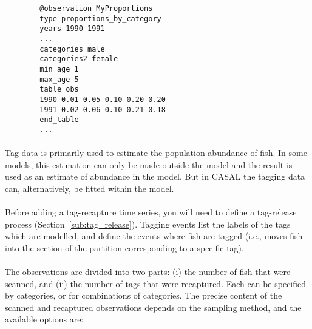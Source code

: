{{{{{\small{\begin{verbatim}
		@observation MyProportions
		type proportions_by_category
		years 1990 1991
		...
		categories male
		categories2 female
		min_age 1
		max_age 5
		table obs
		1990 0.01 0.05 0.10 0.20 0.20
		1991 0.02 0.06 0.10 0.21 0.18
		end_table
		...
		\end{verbatim}}}

\paragraph*{\label{sec:tag-recapture-by-length}}

Tag data is primarily used to estimate the population abundance of fish. In some models, this estimation can only be made outside the model and the result is used as an estimate of abundance in the model. But in CASAL the tagging data can, alternatively, be fitted within the model.
\\\\
Before adding a tag-recapture time series, you will need to define a tag-release process (Section~\ref{sub:tag_release}). Tagging events list the labels of the tags which are modelled, and define the events where fish are tagged (i.e., \CNAME moves fish into the section of the partition corresponding to a specific tag).
\\\\
The observations are divided into two parts: (i) the number of fish that were scanned, and (ii) the number of tags that were recaptured. Each can be specified by categories, or for combinations of categories. The precise content of the scanned and recaptured observations depends on the sampling method, and the available options are:

}}}}
